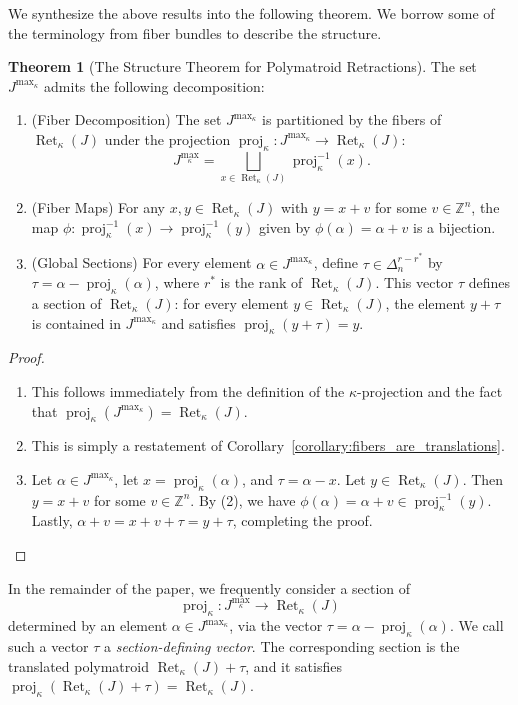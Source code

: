 \documentclass[11pt]{article}
\theoremstyle{definition}
\newtheorem{theorem}{Theorem}[section]
\theoremstyle{remark}
\DeclareMathOperator{\proj}{proj}              %
\newcommand{\kproj}{\proj_{\kappa}}            %
\DeclareMathOperator{\Ret}{Ret}                %
\newcommand{\RetK}{\Ret_{\kappa}}              %
\newcommand{\Jmax}{J^{\max_{\kappa}}}
\begin{document}
We synthesize the above results into the following theorem. We borrow some of the terminology from fiber bundles to describe the structure. 

\begin{theorem}[The Structure Theorem for Polymatroid Retractions] \label{theorem:structure_theorem_for_mconvex}
    The set $\Jmax$ admits the following decomposition:

    \begin{enumerate}
        \item [\textup{(1)}] (Fiber Decomposition) The set $\Jmax$ is partitioned by the fibers of $\RetK(J)$ under the projection $\kproj \colon \Jmax \rightarrow \RetK(J)$:
        \[
        \Jmax = \bigsqcup_{x\in \RetK(J)} \kproj^{-1}(x).
        \]

        \item [\textup{(2)}](Fiber Maps) For any $x,y \in \RetK(J)$ with $y = x + v$ for some $v \in \mathbb{Z}^n$, the map $\phi\colon \kproj^{-1}(x) \to \kproj^{-1}(y)$ given by $\phi(\alpha) = \alpha + v$ is a bijection.

        \item [\textup{(3)}](Global Sections) For every element $\alpha \in \Jmax$, define $\tau \in \Delta_n^{r-r^*}$ by $\tau = \alpha - \kproj(\alpha)$, where $r^*$ is the rank of $\RetK(J)$. This vector $\tau$ defines a section of $\RetK(J)$: for every element $y \in \RetK(J)$, the element $y + \tau$ is contained in $\Jmax$ and satisfies $\kproj(y+\tau) = y$. 
    \end{enumerate}
\end{theorem}
\begin{proof}
\leavevmode
\begin{enumerate}
    \item [\textup{(1)}]This follows immediately from the definition of the $\kappa$-projection and the fact that $\kproj(\Jmax) = \RetK(J)$.
    \item [\textup{(2)}]This is simply a restatement of Corollary~\ref{corollary:fibers_are_translations}.
    \item [\textup{(3)}]Let $\alpha \in \Jmax$, let $x = \kproj(\alpha)$, and $\tau = \alpha - x$. Let $y \in \RetK(J)$. Then $y = x + v$ for some $v \in \mathbb{Z}^n$. By (2), we have $\phi(\alpha) = \alpha + v \in \kproj^{-1}(y)$. Lastly, $\alpha + v = x + v + \tau = y+ \tau$, completing the proof.
\end{enumerate} 
\end{proof}
In the remainder of the paper, we frequently consider a section of
\[
    \kproj\colon\Jmax\to\RetK(J)
\]
determined by an element $\alpha\in\Jmax$, via the vector $\tau=\alpha-\kproj(\alpha)$. We call such a vector $\tau$ a \emph{section-defining vector}. The corresponding section is the translated polymatroid $\RetK(J)+\tau$, and it satisfies $\kproj(\RetK(J)+\tau)=\RetK(J)$.
\end{document}
